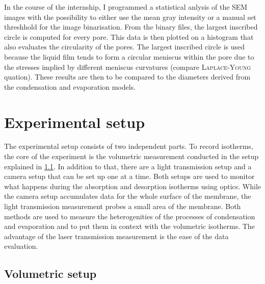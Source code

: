 \documentclass[../thesis.tex]{subfiles}
\begin{document}
      In the course of the internship, I programmed a statistical anlysis of the SEM images with the possibility to either use the mean gray intensity or a manual set threshhold for the image binarisation. From the binary files, the largest inscribed circle is computed for every pore. This data is then plotted on a histogram that also evaluates the circularity of the pores. The largest inscribed circle is used because the liquid film tends to form a circular meniscus within the pore due to the stresses implied by different meniscus curvatures (compare \textsc{Laplace-Young} quation). These results are then to be compared to the diameters derived from the condensation and evaporation models.


  \section{Experimental setup}
  \label{sec:experimental-setup}

    The experimental setup consists of two independent parts. To record isotherms, the core of the experiment is the volumetric measurement conducted in the setup explained in \cref{subsec:volumetric-setup}. In addition to that, there are a light transmission setup and a camera setup that can be set up one at a time. Both setups are used to monitor what happens during the absorption and desorption isotherms using optics. While the camera setup accumulates data for the whole surface of the membrane, the light transmission measurement probes a small area of the membrane. Both methods are used to measure the heterogenities of the processes of condensation and evaporation and to put them in context with the volumetric isotherms. The advantage of the laser transmission measurement is the ease of the data evaluation.


    \subsection{Volumetric setup}
    \label{subsec:volumetric-setup}
\end{document}
